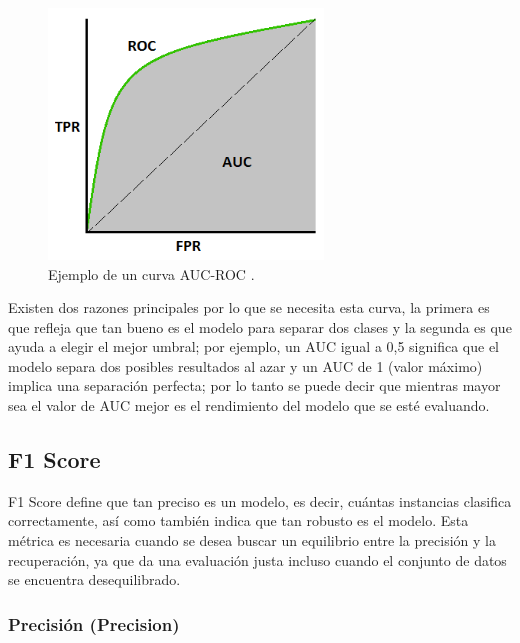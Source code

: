 \begin{figure}[h!]
  \begin{center}	\includegraphics[width=0.65\textwidth, frame]{imagenes/Cap4/auc_roc}
  \caption{Ejemplo de un curva AUC-ROC \protect\cite{Reference62}.}
  \label{fig:auc_roc}
  \end{center}
\end{figure}


\vspace{5mm} %

Existen dos razones principales por lo que se necesita esta curva, la primera es que refleja que tan bueno es el modelo para separar dos clases y la segunda es que ayuda a elegir el mejor umbral; por ejemplo, un AUC igual a 0,5 significa que el modelo separa dos posibles resultados al azar y un AUC de 1 (valor m\'{a}ximo) implica una separaci\'{o}n perfecta; por lo tanto se puede decir que mientras mayor sea el valor de AUC mejor es el rendimiento del modelo que se est\'{e} evaluando.

\subsection{F1 Score}

F1 Score define que tan preciso es un modelo, es decir, cu\'{a}ntas instancias clasifica correctamente, as\'{i} como tambi\'{e}n indica que tan robusto es el modelo. Esta m\'{e}trica es necesaria cuando se desea buscar un equilibrio entre la precisi\'{o}n y la recuperaci\'{o}n, ya que da una evaluaci\'{o}n justa incluso cuando el conjunto de datos se encuentra desequilibrado.

\subsubsection{Precisi\'{o}n (Precision)}

